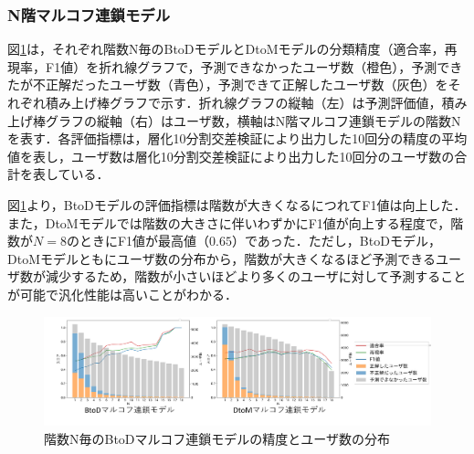 \documentclass[submit,ses,noauthor]{ipsj}
\newcommand{\todo}[1]{\colorbox{yellow}{{\bf TODO}:}{\color{red} {\textbf{[#1]}}}}
\begin{document}

\subsubsection{N階マルコフ連鎖モデル}\label{sec:markovResult}

図\ref{fig:markov-btod}は，それぞれ階数N毎のBtoDモデルとDtoMモデルの分類精度（適合率，再現率，F1値）を折れ線グラフで，予測できなかったユーザ数（橙色），予測できたが不正解だったユーザ数（青色），予測できて正解したユーザ数（灰色）をそれぞれ積み上げ棒グラフで示す．折れ線グラフの縦軸（左）は予測評価値，積み上げ棒グラフの縦軸（右）はユーザ数，横軸はN階マルコフ連鎖モデルの階数Nを表す．各評価指標は，層化10分割交差検証により出力した10回分の精度の平均値を表し，ユーザ数は層化10分割交差検証により出力した10回分のユーザ数の合計を表している．

図\ref{fig:markov-btod}より，BtoDモデルの評価指標は階数が大きくなるにつれてF1値は向上した．また，DtoMモデルでは階数の大きさに伴いわずかにF1値が向上する程度で，階数が$N=8$のときにF1値が最高値（$0.65$）であった．ただし，BtoDモデル，DtoMモデルともにユーザ数の分布から，階数が大きくなるほど予測できるユーザ数が減少するため，階数が小さいほどより多くのユーザに対して予測することが可能で汎化性能は高いことがわかる．

\begin{figure}[t]
	\centering
	\includegraphics[width=0.9\linewidth]{Okamoto_fig/btod-dtom-markov.pdf}
        \vspace{-5mm}
	\caption{階数N毎のBtoDマルコフ連鎖モデルの精度とユーザ数の分布}
	\label{fig:markov-btod}
 \vspace{-4mm}
\end{figure}
\end{document}
